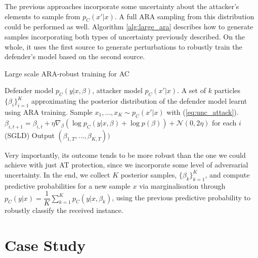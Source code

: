 The previous approaches incorporate some uncertainty about the attacker's elements to sample from $p_C(x' \vert x)$. A full ARA sampling from this distribution could be performed as well. 
Algorithm \ref{alg:large_ara} describes how to generate samples incorporating both types of uncertainty previously described. On the whole, it uses the first source to generate perturbations to robustly train the defender's model based on the second source. 


\begin{algorithm}[!ht] %
\caption{Large scale ARA-robust training for AC}  
\label{alg:large_ara}
\begin{algorithmic}
 Defender model $p_C(y|x,\beta)$, attacker model $p_C(x'|x)$. 
 A set of $k$ particles $\{\beta_i\}_{i=1}^{K}$  approximating the posterior distribution of the defender model learnt using ARA training.  
\State Sample $x_1, \ldots,  x_K \sim p_C(x' | x)$ with 
(\ref{eq:unc_attack}).
\State $\beta_{i,t+1} = \beta_{i,t} + \eta \nabla_\beta (\log p_C(y|x, \beta) + \log p(\beta)) + \mathcal{N}(0, 2\eta )$ for each $i$ (SGLD)
\EndFor
\State Output $(\beta_{1,T},...,\beta_{K,T}))$
\end{algorithmic}
\end{algorithm}

Very importantly, its outcome tends to be more robust  than
the one we could achieve with just AT protection, since we incorporate some level of adversarial uncertainty. In the end, we collect $K$ posterior samples, $\lbrace \beta_k \rbrace_{k=1}^K$, and compute predictive probabilities for a new sample $x$ via marginalisation
through
$p_C(y|x) = \dfrac{1}{K} \sum_{k=1}^K p_C(y|x, \beta_k)$,
using the previous predictive probability to robustly classify the
received instance.


 




\section{Case Study}
\label{sec:conEx}

